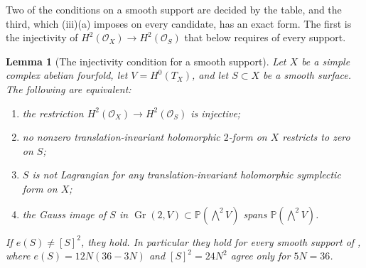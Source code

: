 \documentclass[11pt,reqno]{amsart}
\theoremstyle{plain}
\newtheorem{lemma}[theorem]{Lemma}
\theoremstyle{definition}
\theoremstyle{remark}
\newcommand{\PP}{\mathbb{P}}
\newcommand{\cO}{\mathcal{O}}
\begin{document}
Two of the conditions on a smooth support are decided by the table, and the
third, which (iii)(a) imposes on every candidate, has an
exact form. The first is the injectivity of $H^{2}(\cO_{X})\to H^{2}(\cO_{S})$
that  below requires of every support.

\begin{lemma}[The injectivity condition for a smooth support]
\label{lem:smoothinjective}
Let $X$ be a simple complex abelian fourfold, let $V=H^{0}(T_{X})$, and let
$S\subset X$ be a smooth surface. The following are equivalent:
\begin{enumerate}[label=\textup{(\roman*)},nosep,leftmargin=2.2em]
\item the restriction $H^{2}(\cO_{X})\to H^{2}(\cO_{S})$ is injective;
\item no nonzero translation-invariant holomorphic $2$-form on $X$ restricts
  to zero on $S$;
\item $S$ is not Lagrangian for any translation-invariant holomorphic
  symplectic form on $X$;
\item the Gauss image of $S$ in $\operatorname{Gr}(2,V)\subset\PP(\bigwedge^{2}V)$
  spans $\PP(\bigwedge^{2}V)$.
\end{enumerate}
If $e(S)\ne[S]^{2}$, they hold. In particular they hold for every smooth
support of , where $e(S)=12N(36-3N)$ and
$[S]^{2}=24N^{2}$ agree only for $5N=36$.
\end{lemma}
\end{document}
